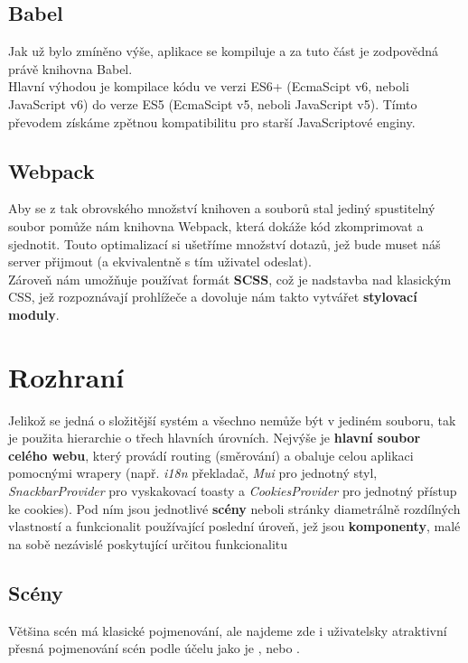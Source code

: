 \subsection{Babel}
Jak už bylo zmíněno výše, aplikace se kompiluje a za tuto část je zodpovědná právě knihovna Babel.\\
Hlavní výhodou je kompilace kódu ve verzi ES6+ (EcmaScipt v6, neboli JavaScript v6) do verze
ES5 (EcmaScipt v5, neboli JavaScript v5).
Tímto převodem získáme zpětnou kompatibilitu pro starší JavaScriptové enginy.

\subsection{Webpack}
Aby se z tak obrovského množství knihoven a souborů stal jediný spustitelný soubor pomůže nám
knihovna Webpack, která dokáže kód zkomprimovat a sjednotit. Touto optimalizací si ušetříme
množství dotazů, jež bude muset náš server přijmout (a ekvivalentně s tím uživatel odeslat).\\
Zároveň nám umožňuje používat formát \textbf{SCSS}, což je nadstavba nad klasickým CSS, jež 
rozpoznávají prohlížeče a dovoluje nám takto vytvářet \textbf{stylovací moduly}.

\section{Rozhraní}
Jelikož se jedná o složitější systém a všechno nemůže být  v jediném souboru, tak 
je použita hierarchie o třech hlavních úrovních. Nejvýše je \textbf{hlavní soubor celého webu}, který
provádí routing (směrování) a obaluje celou aplikaci pomocnými wrapery (např. \textit{i18n}
překladač, \textit{Mui} pro jednotný styl, \textit{SnackbarProvider} pro vyskakovací
toasty a \textit{CookiesProvider} pro jednotný přístup ke cookies). Pod ním jsou jednotlivé
\textbf{scény} neboli stránky diametrálně rozdílných vlastností a funkcionalit používající poslední
úroveň, jež jsou \textbf{komponenty}, malé na sobě nezávislé 
poskytující určitou funkcionalitu


\subsection{Scény}
Většina scén má klasické pojmenování, ale najdeme zde i uživatelsky atraktivní přesná
pojmenování scén podle účelu jako je ,  nebo .

